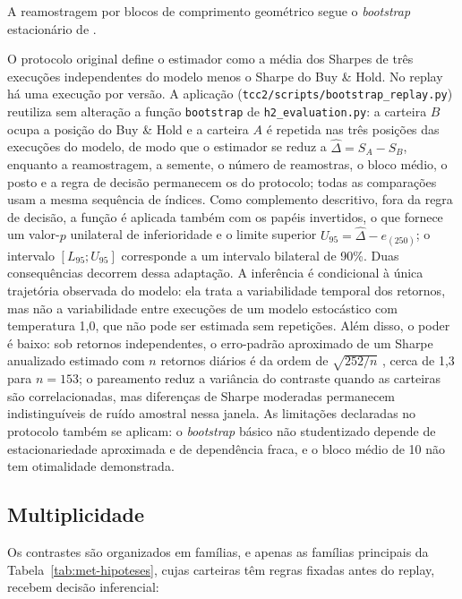 \documentclass{eic-bcc-tcc}
\begin{document}
A reamostragem por blocos de comprimento geométrico segue o \textit{bootstrap} estacionário de \citet{Politis1994}.

O protocolo original define o estimador como a média dos Sharpes de três execuções independentes do modelo menos o Sharpe do Buy \& Hold. No replay há uma execução por versão. A aplicação (\texttt{tcc2/scripts/bootstrap\_replay.py}) reutiliza sem alteração a função \texttt{bootstrap} de \texttt{h2\_evaluation.py}: a carteira $B$ ocupa a posição do Buy \& Hold e a carteira $A$ é repetida nas três posições das execuções do modelo, de modo que o estimador se reduz a $\hat{\Delta} = S_A - S_B$, enquanto a reamostragem, a semente, o número de reamostras, o bloco médio, o posto e a regra de decisão permanecem os do protocolo; todas as comparações usam a mesma sequência de índices. Como complemento descritivo, fora da regra de decisão, a função é aplicada também com os papéis invertidos, o que fornece um valor-$p$ unilateral de inferioridade e o limite superior $U_{95} = \hat{\Delta} - e_{(250)}$; o intervalo $[L_{95}; U_{95}]$ corresponde a um intervalo bilateral de 90\%. Duas consequências decorrem dessa adaptação. A inferência é condicional à única trajetória observada do modelo: ela trata a variabilidade temporal dos retornos, mas não a variabilidade entre execuções de um modelo estocástico com temperatura 1,0, que não pode ser estimada sem repetições. Além disso, o poder é baixo: sob retornos independentes, o erro-padrão aproximado de um Sharpe anualizado estimado com $n$ retornos diários é da ordem de $\sqrt{252/n}$ \citep{Lo2002}, cerca de 1,3 para $n = 153$; o pareamento reduz a variância do contraste quando as carteiras são correlacionadas, mas diferenças de Sharpe moderadas permanecem indistinguíveis de ruído amostral nessa janela. As limitações declaradas no protocolo também se aplicam: o \textit{bootstrap} básico não studentizado depende de estacionariedade aproximada e de dependência fraca, e o bloco médio de 10 não tem otimalidade demonstrada.

\subsection{Multiplicidade}

Os contrastes são organizados em famílias, e apenas as famílias principais da Tabela~\ref{tab:met-hipoteses}, cujas carteiras têm regras fixadas antes do replay, recebem decisão inferencial:
\end{document}
